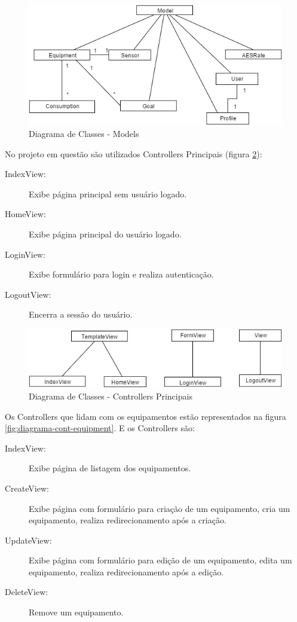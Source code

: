 \begin{figure}
\centering
\includegraphics[width=14cm,keepaspectratio]{figuras/diagrama_models.png}
\caption{\label{fig:diagrama-models} Diagrama de Classes - Models}
\end{figure}

No projeto em questão são utilizados Controllers Principais (figura \ref{fig:diagrama-cont-principal}):
\begin{description}
	\item[IndexView:] Exibe página principal sem usuário logado.
	\item[HomeView:] Exibe página principal do usuário logado.
	\item[LoginView:] Exibe formulário para login e realiza autenticação.
	\item[LogoutView:] Encerra a sessão do usuário.
\end{description} 

\begin{figure}
\centering
\includegraphics[width=14cm,keepaspectratio]{figuras/diagrama_cont_principal.png}
\caption{\label{fig:diagrama-cont-principal} Diagrama de Classes - Controllers Principais}
\end{figure}

Os Controllers que lidam com os equipamentos estão representados na figura \ref{fig:diagrama-cont-equipment}. E os Controllers são:
\begin{description}
	\item[IndexView:] Exibe página de listagem dos equipamentos.
	\item[CreateView:] Exibe página com formulário para criação de um equipamento, cria um equipamento, realiza redirecionamento após a criação.
	\item[UpdateView:] Exibe página com formulário para edição de um equipamento, edita um equipamento, realiza redirecionamento após a edição.
	\item[DeleteView:] Remove um equipamento.
\end{description} 

